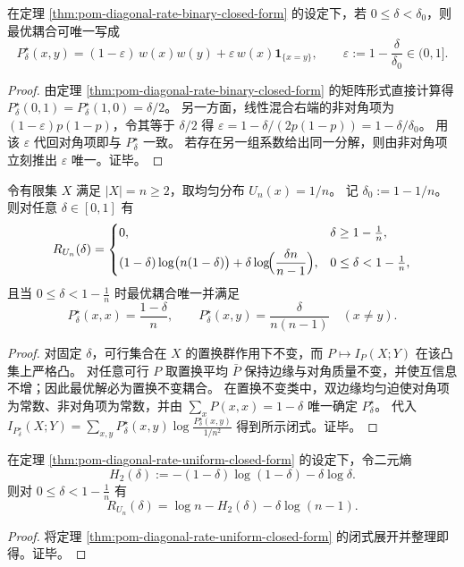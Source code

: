 \begin{corollary}[二点字母表的线性混合结构]\label{cor:pom-diagonal-rate-binary-linear-mixture}
在定理 \ref{thm:pom-diagonal-rate-binary-closed-form} 的设定下，若 \(0\le\delta<\delta_0\)，则最优耦合可唯一写成
\[
P^\star_\delta(x,y)=(1-\varepsilon)\,w(x)w(y)+\varepsilon\,w(x)\mathbf 1_{\{x=y\}},
\qquad
\varepsilon:=1-\frac{\delta}{\delta_0}\in(0,1].
\]
\end{corollary}
\begin{proof}
由定理 \ref{thm:pom-diagonal-rate-binary-closed-form} 的矩阵形式直接计算得
\(
P^\star_\delta(0,1)=P^\star_\delta(1,0)=\delta/2
\)。
另一方面，线性混合右端的非对角项为 \((1-\varepsilon)p(1-p)\)，令其等于 \(\delta/2\) 得 \(\varepsilon=1-\delta/(2p(1-p))=1-\delta/\delta_0\)。
用该 \(\varepsilon\) 代回对角项即与 \(P^\star_\delta\) 一致。
若存在另一组系数给出同一分解，则由非对角项立刻推出 \(\varepsilon\) 唯一。证毕。
\end{proof}

\begin{theorem}[均匀分布的闭式与唯一对称最优耦合]\label{thm:pom-diagonal-rate-uniform-closed-form}
令有限集 \(X\) 满足 \(|X|=n\ge 2\)，取均匀分布 \(U_n(x)=1/n\)。
记 \(\delta_0:=1-1/n\)。
则对任意 \(\delta\in[0,1]\) 有
\[
R_{U_n}(\delta)=
\begin{cases}
0, & \delta\ge 1-\frac{1}{n},\\[6pt]
(1-\delta)\log\bigl(n(1-\delta)\bigr)+\delta\log\!\Bigl(\dfrac{\delta n}{n-1}\Bigr), & 0\le\delta<1-\frac{1}{n},
\end{cases}
\]
且当 \(0\le\delta<1-\frac1n\) 时最优耦合唯一并满足
\[
P^\star_\delta(x,x)=\frac{1-\delta}{n},\qquad
P^\star_\delta(x,y)=\frac{\delta}{n(n-1)}\quad(x\ne y).
\]
\end{theorem}
\begin{proof}
对固定 \(\delta\)，可行集合在 \(X\) 的置换群作用下不变，而 \(P\mapsto I_P(X;Y)\) 在该凸集上严格凸。
对任意可行 \(P\) 取置换平均 \(\bar P\) 保持边缘与对角质量不变，并使互信息不增；因此最优解必为置换不变耦合。
在置换不变类中，双边缘均匀迫使对角项为常数、非对角项为常数，并由 \(\sum_x P(x,x)=1-\delta\) 唯一确定 \(P^\star_\delta\)。
代入
\(
I_{P^\star_\delta}(X;Y)=\sum_{x,y}P^\star_\delta(x,y)\log\frac{P^\star_\delta(x,y)}{1/n^2}
\)
得到所示闭式。证毕。
\end{proof}

\begin{corollary}[熵型重写]\label{cor:pom-diagonal-rate-uniform-entropy-rewrite}
在定理 \ref{thm:pom-diagonal-rate-uniform-closed-form} 的设定下，令二元熵
\[
H_2(\delta):=-(1-\delta)\log(1-\delta)-\delta\log\delta.
\]
则对 \(0\le\delta<1-\tfrac1n\) 有
\[
R_{U_n}(\delta)=\log n-H_2(\delta)-\delta\log(n-1).
\]
\end{corollary}
\begin{proof}
将定理 \ref{thm:pom-diagonal-rate-uniform-closed-form} 的闭式展开并整理即得。证毕。
\end{proof}


